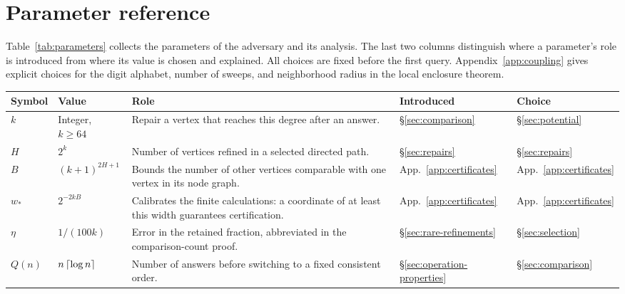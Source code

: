 \section{Parameter reference}\label{app:parameters}

Table~\ref{tab:parameters} collects the parameters of the adversary and its
analysis. The last two columns
distinguish where a parameter's role is introduced from where its value
is chosen and explained. All choices are fixed before the first query.
Appendix~\ref{app:coupling} gives explicit choices for the digit alphabet,
number of sweeps, and neighborhood radius in the local enclosure theorem.

\begin{center}
\begin{minipage}{\linewidth}
\captionsetup{hypcap=false}
\label{tab:parameters}
\small
\setlength{\tabcolsep}{4pt}
\renewcommand{\arraystretch}{1.4}
\begin{tabular}{@{}p{.07\linewidth}p{.21\linewidth}p{.37\linewidth}p{.12\linewidth}p{.12\linewidth}@{}}
\toprule
Symbol & Value & Role & Introduced & Choice\\
\midrule
$k$ & Integer, $k\ge64$ & Repair a vertex that reaches this degree after an answer. & \S\ref{sec:comparison} & \S\ref{sec:potential}\\
$H$ & $2^k$ & Number of vertices refined in a selected directed path. & \S\ref{sec:repairs} & \S\ref{sec:repairs}\\
$B$ & $(k+1)^{2H+1}$ & Bounds the number of other vertices comparable with one vertex in its node graph. & App.~\ref{app:certificates} & App.~\ref{app:certificates}\\
$w_*$ & $2^{-2kB}$ & Calibrates the finite calculations: a coordinate of at least this width guarantees certification. & App.~\ref{app:certificates} & App.~\ref{app:certificates}\\
$\eta$ & $1/(100k)$ & Error in the retained fraction, abbreviated in the comparison-count proof. & \S\ref{sec:rare-refinements} & \S\ref{sec:selection}\\
$Q(n)$ & $n\left\lceil \log n\right\rceil$ & Number of answers before switching to a fixed consistent order. & \S\ref{sec:operation-properties} & \S\ref{sec:comparison}\\
\bottomrule
\end{tabular}
\end{minipage}
\end{center}
